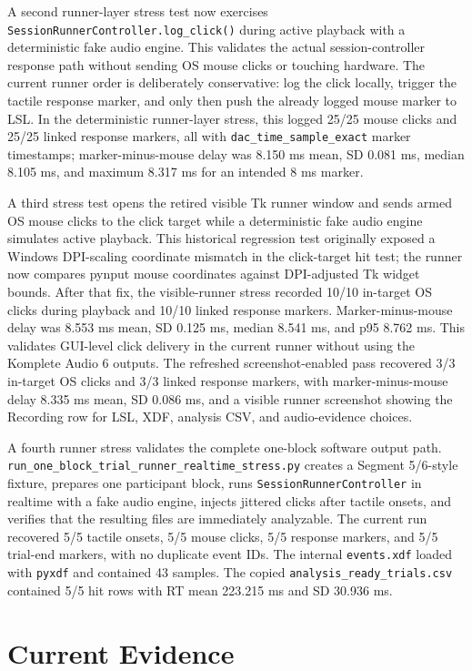 \documentclass[11pt]{article}
\begin{document}
A second runner-layer stress test now exercises
\texttt{SessionRunnerController.log\_click()} during active playback with a
deterministic fake audio engine. This validates the actual session-controller
response path without sending OS mouse clicks or touching hardware. The current
runner order is deliberately conservative: log the click locally, trigger the
tactile response marker, and only then push the already logged mouse marker to
LSL. In the deterministic runner-layer stress, this logged 25/25 mouse clicks
and 25/25 linked response markers, all with
\texttt{dac\_time\_sample\_exact} marker timestamps; marker-minus-mouse delay
was 8.150 ms mean, SD 0.081 ms, median 8.105 ms, and maximum 8.317 ms for an
intended 8 ms marker.

A third stress test opens the retired visible Tk runner window and sends armed
OS mouse clicks to the click target while a deterministic fake audio engine
simulates active playback. This historical regression test originally exposed a
Windows DPI-scaling coordinate mismatch in the click-target hit test; the runner
now compares pynput mouse coordinates against DPI-adjusted Tk widget bounds.
After that fix, the visible-runner stress recorded 10/10 in-target OS clicks
during playback and 10/10 linked response markers. Marker-minus-mouse delay was
8.553 ms mean, SD 0.125 ms, median 8.541 ms, and p95 8.762 ms. This validates
GUI-level click
delivery in the current runner without using the Komplete Audio 6 outputs.
The refreshed screenshot-enabled pass recovered 3/3 in-target OS clicks and
3/3 linked response markers, with marker-minus-mouse delay 8.335 ms mean, SD
0.086 ms, and a visible runner screenshot showing the Recording row for LSL,
XDF, analysis CSV, and audio-evidence choices.

A fourth runner stress validates the complete one-block software output path.
\texttt{run\_one\_block\_trial\_runner\_realtime\_stress.py} creates a
Segment 5/6-style fixture, prepares one participant block, runs
\texttt{SessionRunnerController} in realtime with a fake audio engine, injects
jittered clicks after tactile onsets, and verifies that the resulting files are
immediately analyzable. The current run recovered 5/5 tactile onsets, 5/5 mouse
clicks, 5/5 response markers, and 5/5 trial-end markers, with no duplicate
event IDs. The internal \texttt{events.xdf} loaded with \texttt{pyxdf} and
contained 43 samples. The copied \texttt{analysis\_ready\_trials.csv} contained
5/5 hit rows with RT mean 223.215 ms and SD 30.936 ms.

\section{Current Evidence}
\end{document}
